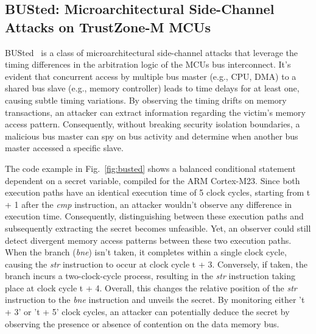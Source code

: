 \subsection{BUSted: Microarchitectural Side-Channel Attacks on TrustZone-M MCUs}
%
BUSted~\cite{busted} is a class of microarchitectural side-channel
attacks that leverage the timing differences in the arbitration
logic of the MCUs bus interconnect. It's evident that concurrent access by
multiple bus master (e.g., CPU, DMA) to a shared bus slave (e.g., memory
controller) leads to time delays for at least one, causing subtle timing
variations. By observing the timing drifts on memory transactions, an
attacker can extract information regarding the victim’s memory access
pattern. Consequently, without breaking security isolation boundaries, a
malicious bus master can spy on bus activity and determine when another bus
master accessed a specific slave.


The code example in Fig.~\ref{fig:busted} shows a balanced conditional statement dependent on a
secret variable, compiled for the ARM Cortex-M23. Since both
execution paths have an identical execution time of 5 clock cycles,
starting from t + 1 after the \textit{cmp} instruction, an attacker
wouldn't observe any difference in execution time. Consequently,
distinguishing between these execution paths and subsequently extracting
the secret becomes unfeasible. Yet, an observer could still detect
divergent memory access patterns between these two execution paths. When
the branch (\textit{bne}) isn't taken, it completes within a single clock
cycle, causing the \textit{str} instruction to occur at clock cycle t + 3.
Conversely, if taken, the branch incurs a two-clock-cycle process,
resulting in the \textit{str} instruction taking place at clock cycle t +
4. Overall, this changes the relative position of the \textit{str}
instruction to the \textit{bne} instruction and unveils the secret. By
monitoring either 't + 3' or 't + 5' clock cycles, an attacker can
potentially deduce the secret by observing the presence or absence of
contention on the data memory bus.

